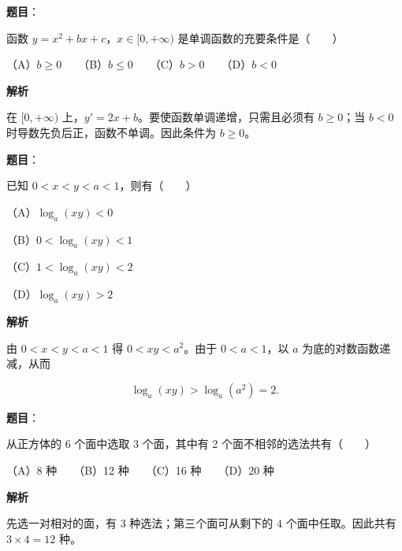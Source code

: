 \begin{answer}

\textbf{题目}：

函数 $y=x^2+bx+c$，$x\in[0,+\infty)$ 是单调函数的充要条件是\mbox{（　　）}

（A）$b\geqslant0$　　（B）$b\leqslant0$　　（C）$b>0$　　（D）$b<0$

\textbf{解析}

在 $[0,+\infty)$ 上，$y'=2x+b$。要使函数单调递增，只需且必须有 $b\geqslant0$；当 $b<0$ 时导数先负后正，函数不单调。因此条件为 $b\geqslant0$。


\end{answer}
\begin{answer}

\textbf{题目}：

已知 $0<x<y<a<1$，则有\mbox{（　　）}

（A）$\log_a(xy)<0$

（B）$0<\log_a(xy)<1$

（C）$1<\log_a(xy)<2$

（D）$\log_a(xy)>2$

\textbf{解析}

由 $0<x<y<a<1$ 得 $0<xy<a^2$。由于 $0<a<1$，以 $a$ 为底的对数函数递减，从而

\nopagebreak[4]
\[
\log_a(xy)>\log_a(a^2)=2.
\]


\end{answer}
\begin{answer}

\textbf{题目}：

从正方体的 6 个面中选取 3 个面，其中有 2 个面不相邻的选法共有\mbox{（　　）}

（A）8 种　　（B）12 种　　（C）16 种　　（D）20 种

\textbf{解析}

先选一对相对的面，有 $3$ 种选法；第三个面可从剩下的 $4$ 个面中任取。因此共有 $3\times4=12$ 种。


\end{answer}
